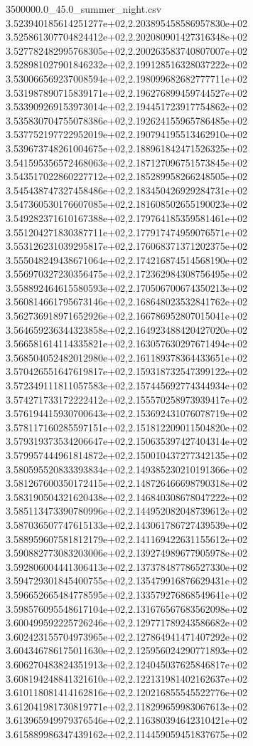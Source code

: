 \begin{filecontents*}{3500000.0_45.0_summer_night.csv}
3.523940185614251277e+02,2.203895458586957830e+02
3.525861307704824412e+02,2.202080901427316348e+02
3.527782482995768305e+02,2.200263583740807007e+02
3.528981027901846232e+02,2.199128516328037222e+02
3.530066569237008594e+02,2.198099682682777711e+02
3.531987890715839171e+02,2.196276899459744527e+02
3.533909269153973014e+02,2.194451723917754862e+02
3.535830704755078386e+02,2.192624155965786485e+02
3.537752197722952019e+02,2.190794195513462910e+02
3.539673748261004675e+02,2.188961842471526325e+02
3.541595356572468063e+02,2.187127096751573845e+02
3.543517022860227712e+02,2.185289958266248505e+02
3.545438747327458486e+02,2.183450426929284731e+02
3.547360530176607085e+02,2.181608502655190023e+02
3.549282371610167388e+02,2.179764185359581461e+02
3.551204271830387711e+02,2.177917474959076571e+02
3.553126231039295817e+02,2.176068371371202375e+02
3.555048249438671064e+02,2.174216874514568190e+02
3.556970327230356475e+02,2.172362984308756495e+02
3.558892464615580593e+02,2.170506700674350213e+02
3.560814661795673146e+02,2.168648023532841762e+02
3.562736918971652926e+02,2.166786952807015041e+02
3.564659236344323858e+02,2.164923488420427020e+02
3.566581614114335821e+02,2.163057630297671494e+02
3.568504052482012980e+02,2.161189378364433651e+02
3.570426551647619817e+02,2.159318732547399122e+02
3.572349111811057583e+02,2.157445692774344934e+02
3.574271733172222412e+02,2.155570258973939417e+02
3.576194415930700643e+02,2.153692431076078719e+02
3.578117160285597151e+02,2.151812209011504820e+02
3.579319373534206647e+02,2.150635397427404314e+02
3.579957444961814872e+02,2.150010437277342135e+02
3.580595520833393834e+02,2.149385230210191366e+02
3.581267600350172415e+02,2.148726466698790318e+02
3.583190504321620438e+02,2.146840308678047222e+02
3.585113473390780996e+02,2.144952082048739612e+02
3.587036507747615133e+02,2.143061786727439539e+02
3.588959607581812179e+02,2.141169422631155612e+02
3.590882773083203006e+02,2.139274989677905978e+02
3.592806004441306413e+02,2.137378487786527330e+02
3.594729301845400755e+02,2.135479916876629431e+02
3.596652665484778595e+02,2.133579276868549641e+02
3.598576095548617104e+02,2.131676567683562098e+02
3.600499592225726246e+02,2.129771789243586682e+02
3.602423155704973965e+02,2.127864941471407292e+02
3.604346786175011630e+02,2.125956024290771893e+02
3.606270483824351913e+02,2.124045037625846817e+02
3.608194248841321610e+02,2.122131981402162637e+02
3.610118081414162816e+02,2.120216855545522776e+02
3.612041981730819771e+02,2.118299659983067613e+02
3.613965949979376546e+02,2.116380394642310421e+02
3.615889986347439162e+02,2.114459059451837675e+02

\end{filecontents*}
